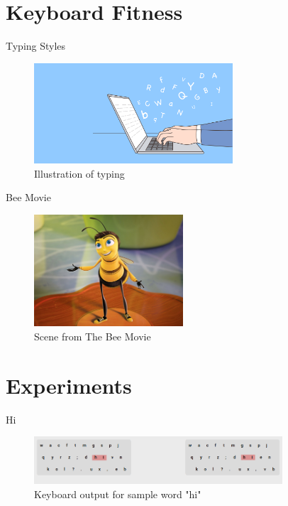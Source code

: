 \documentclass{beamer}
\begin{document}
    \section{Keyboard Fitness}
    \begin{frame}{Typing Styles}
        \begin{figure}
            \centering
            \includegraphics[width=20em, keepaspectratio]{images/typing.png}
            \caption{Illustration of typing \cite{typing}}
        \end{figure}
    \end{frame}

    \begin{frame}{Bee Movie}
        \begin{figure}
            \centering
            \includegraphics[width=15em, keepaspectratio]{images/beeMovie.jpg}
            \caption{Scene from The Bee Movie \cite{bee-movie}}
        \end{figure}
    \end{frame}

    \section{Experiments}

    \begin{frame}{Hi}
        \begin{figure}
            \centering
            \includegraphics[width=25em, keepaspectratio]{images/hiRfp.png}
            \caption{Keyboard output for sample word "hi"}
        \end{figure}
    \end{frame}
\end{document}
